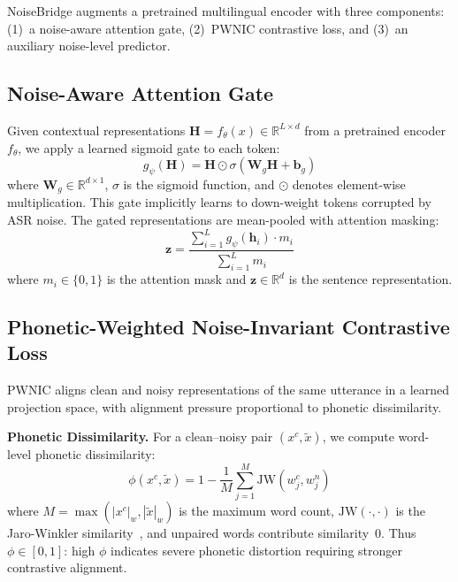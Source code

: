 \documentclass[conference]{IEEEtran}
\begin{document}
NoiseBridge augments a pretrained multilingual encoder with three components: (1)~a noise-aware attention gate, (2)~PWNIC contrastive loss, and (3)~an auxiliary noise-level predictor.

\subsection{Noise-Aware Attention Gate}

Given contextual representations $\mathbf{H} = f_\theta(x) \in \mathbb{R}^{L \times d}$ from a pretrained encoder $f_\theta$, we apply a learned sigmoid gate to each token:
\begin{equation}
    g_\psi(\mathbf{H}) = \mathbf{H} \odot \sigma(\mathbf{W}_g \mathbf{H} + \mathbf{b}_g)
    \label{eq:gate}
\end{equation}
where $\mathbf{W}_g \in \mathbb{R}^{d \times 1}$, $\sigma$ is the sigmoid function, and $\odot$ denotes element-wise multiplication. This gate implicitly learns to down-weight tokens corrupted by ASR noise. The gated representations are mean-pooled with attention masking:
\begin{equation}
    \mathbf{z} = \frac{\sum_{i=1}^{L} g_\psi(\mathbf{h}_i) \cdot m_i}{\sum_{i=1}^{L} m_i}
    \label{eq:pool}
\end{equation}
where $m_i \in \{0, 1\}$ is the attention mask and $\mathbf{z} \in \mathbb{R}^d$ is the sentence representation.

\subsection{Phonetic-Weighted Noise-Invariant Contrastive Loss}
\label{sec:pwnic}

PWNIC aligns clean and noisy representations of the same utterance in a learned projection space, with alignment pressure proportional to phonetic dissimilarity.

\textbf{Phonetic Dissimilarity.} For a clean--noisy pair $(x^c, \tilde{x})$, we compute word-level phonetic dissimilarity:
\begin{equation}
    \phi(x^c, \tilde{x}) = 1 - \frac{1}{M} \sum_{j=1}^{M} \text{JW}(w_j^c, w_j^n)
    \label{eq:phi}
\end{equation}
where $M = \max(|x^c|_w, |\tilde{x}|_w)$ is the maximum word count, $\text{JW}(\cdot, \cdot)$ is the Jaro-Winkler similarity~\cite{winkler1990string}, and unpaired words contribute similarity~0. Thus $\phi \in [0, 1]$: high $\phi$ indicates severe phonetic distortion requiring stronger contrastive alignment.
\end{document}
